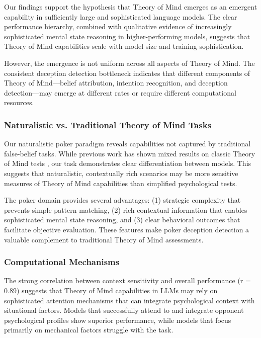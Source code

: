 Our findings support the hypothesis that Theory of Mind emerges as an emergent capability in sufficiently large and sophisticated language models. The clear performance hierarchy, combined with qualitative evidence of increasingly sophisticated mental state reasoning in higher-performing models, suggests that Theory of Mind capabilities scale with model size and training sophistication.

However, the emergence is not uniform across all aspects of Theory of Mind. The consistent deception detection bottleneck indicates that different components of Theory of Mind—belief attribution, intention recognition, and deception detection—may emerge at different rates or require different computational resources.

\subsubsection{Naturalistic vs. Traditional Theory of Mind Tasks}

Our naturalistic poker paradigm reveals capabilities not captured by traditional false-belief tasks. While previous work has shown mixed results on classic Theory of Mind tests \cite{ullman2023large}, our task demonstrates clear differentiation between models. This suggests that naturalistic, contextually rich scenarios may be more sensitive measures of Theory of Mind capabilities than simplified psychological tests.

The poker domain provides several advantages: (1) strategic complexity that prevents simple pattern matching, (2) rich contextual information that enables sophisticated mental state reasoning, and (3) clear behavioral outcomes that facilitate objective evaluation. These features make poker deception detection a valuable complement to traditional Theory of Mind assessments.

\subsubsection{Computational Mechanisms}

The strong correlation between context sensitivity and overall performance (r = 0.89) suggests that Theory of Mind capabilities in LLMs may rely on sophisticated attention mechanisms that can integrate psychological context with situational factors. Models that successfully attend to and integrate opponent psychological profiles show superior performance, while models that focus primarily on mechanical factors struggle with the task.

